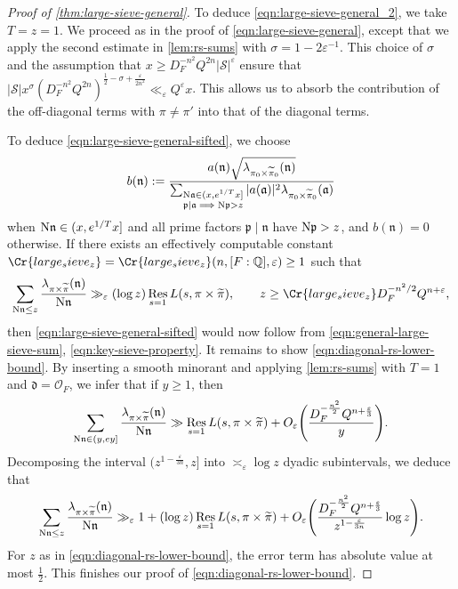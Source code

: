 \documentclass[11pt]{amsart}
\theoremstyle{remark}
\numberwithin{equation}{section}
\newcommand{\ka}{\mathfrak{a}}
\renewcommand{\d}{\mathfrak{d}}
\newcommand{\p}{\mathfrak{p}}
\newcommand{\n}{\mathfrak{n}}
\newcommand{\kn}{\mathfrak{n}}
\newcommand{\N}{\textnormal{N}}
\newcommand{\Q}{\mathbb{Q}}
\newcommand{\mO}{\mathcal{O}}
\newcommand{\mS}{\mathcal{S}}
\newcommand{\eps}{\varepsilon}
\renewcommand{\tilde}{\widetilde}
\newcommand{\Res}{\textnormal{Res}}
\renewcommand{\epsilon}{\varepsilon}
\begin{document}
\begin{proof}[Proof of \cref{thm:large-sieve-general}]
To deduce \eqref{eqn:large-sieve-general_2}, we take $T=z=1$.  We proceed as in the proof of \eqref{eqn:large-sieve-general}, except that we apply the second estimate in \cref{lem:rs-sums} with $\sigma = 1-2\epsilon^{-1}$. This choice of $\sigma$ and the assumption that $x \ge D_F^{-n^2} Q^{2n} |\mS|^\eps$ ensure that $
    |\mS| x^{\sigma}(D_F^{-n^2}Q^{2n})^{\frac{1}{2}-\sigma+\frac{\epsilon}{2n^2}}
    \ll_{\epsilon} Q^{\epsilon}x$.  This allows us to absorb the contribution of the off-diagonal terms with $\pi \neq \pi'$ into that of the diagonal terms.

To deduce \eqref{eqn:large-sieve-general-sifted}, we choose
\[
    b(\n) := 
    \frac{a(\n) \sqrt{\lambda_{\pi_0 \times \tilde\pi_0}(\n)}}{\sum_{\substack{\N \ka \in (x, e^{1/T}x] \\ \p \mid \ka \implies \N\p > z}} |a(\ka)|^2 \lambda_{\pi_0 \times \tilde\pi_0}(\ka)}
\]
when $\N\n \in (x, e^{1/T}x]$ and all prime factors $\p \mid \n$ have $\N \p > z$, and $b(\kn)=0$ otherwise.  If there exists an effectively computable constant $\Cr{large_sieve_z}=\Cr{large_sieve_z}(n,[F:\Q],\eps)\geq 1$ such that
\begin{equation}
\label{eqn:diagonal-rs-lower-bound}
    \sum_{\N \n \le z} \frac{\lambda_{\pi \times \tilde\pi}(\n)}{\N \n}
    \gg_{\eps}
    (\log z) \mathop{\Res}_{s = 1} L(s, \pi \times \tilde\pi),\qquad z \geq \Cr{large_sieve_z} D_F^{-n^2/2}Q^{n+\eps},
\end{equation}
then \eqref{eqn:large-sieve-general-sifted} would now follow from \eqref{eqn:general-large-sieve-sum}, \eqref{eqn:key-sieve-property}.  It remains to show \eqref{eqn:diagonal-rs-lower-bound}.  By inserting a smooth minorant and applying \cref{lem:rs-sums} with $T = 1$ and $\d = \mO_F$, we infer that if $y\geq 1$, then
\[
    \sum_{\N \n \in (y, ey]} \frac{\lambda_{\pi \times \tilde\pi}(\n)}{\N \n}
    \gg
    \mathop{\Res}_{s=1} L(s, \pi \times \tilde\pi) + O_\eps\Bigg(\frac{D_F^{-\frac{n^2}{2}}Q^{n+\frac{\eps}{3}}}{y}\Bigg).
\]
Decomposing the interval $(z^{1-\frac{\eps}{3n}}, z]$ into $\asymp_\eps \log z$ dyadic subintervals, we deduce that
\[
    \sum_{\N \n \le z} \frac{\lambda_{\pi \times \tilde\pi}(\n)}{\N \n}
    \gg_\eps
    1 + (\log z) \mathop{\Res}_{s=1} L(s, \pi \times \tilde\pi) + O_\eps\Bigg(\frac{D_F^{-\frac{n^2}{2}}Q^{n+\frac{\eps}{3}}}{z^{1-\frac{\eps}{3n}}} \log z\Bigg).
\]
For $z$ as in \eqref{eqn:diagonal-rs-lower-bound}, the error term has absolute value at most $\frac{1}{2}$.  This finishes our proof of \eqref{eqn:diagonal-rs-lower-bound}.
\end{proof}
\end{document}
